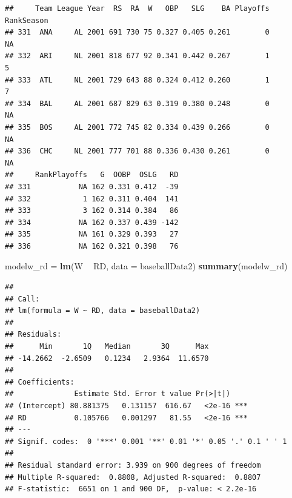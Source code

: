 \documentclass[
]{article}
\newenvironment{Shaded}{\begin{snugshade}}{\end{snugshade}}
\newcommand{\DataTypeTok}[1]{\textcolor[rgb]{0.13,0.29,0.53}{#1}}
\newcommand{\DecValTok}[1]{\textcolor[rgb]{0.00,0.00,0.81}{#1}}
\newcommand{\KeywordTok}[1]{\textcolor[rgb]{0.13,0.29,0.53}{\textbf{#1}}}
\newcommand{\NormalTok}[1]{#1}
\newcommand{\OperatorTok}[1]{\textcolor[rgb]{0.81,0.36,0.00}{\textbf{#1}}}
\newcommand{\StringTok}[1]{\textcolor[rgb]{0.31,0.60,0.02}{#1}}
\begin{document}
\begin{Shaded}
\end{Shaded}

\begin{verbatim}
##     Team League Year  RS  RA  W   OBP   SLG    BA Playoffs RankSeason
## 331  ANA     AL 2001 691 730 75 0.327 0.405 0.261        0         NA
## 332  ARI     NL 2001 818 677 92 0.341 0.442 0.267        1          5
## 333  ATL     NL 2001 729 643 88 0.324 0.412 0.260        1          7
## 334  BAL     AL 2001 687 829 63 0.319 0.380 0.248        0         NA
## 335  BOS     AL 2001 772 745 82 0.334 0.439 0.266        0         NA
## 336  CHC     NL 2001 777 701 88 0.336 0.430 0.261        0         NA
##     RankPlayoffs   G  OOBP  OSLG   RD
## 331           NA 162 0.331 0.412  -39
## 332            1 162 0.311 0.404  141
## 333            3 162 0.314 0.384   86
## 334           NA 162 0.337 0.439 -142
## 335           NA 161 0.329 0.393   27
## 336           NA 162 0.321 0.398   76
\end{verbatim}

\begin{Shaded}
\begin{Highlighting}[]
\NormalTok{modelw_rd =}\StringTok{ }\KeywordTok{lm}\NormalTok{(W }\OperatorTok{~}\StringTok{ }\NormalTok{RD, }\DataTypeTok{data =}\NormalTok{ baseballData2)}
\KeywordTok{summary}\NormalTok{(modelw_rd)}
\end{Highlighting}
\end{Shaded}

\begin{verbatim}
## 
## Call:
## lm(formula = W ~ RD, data = baseballData2)
## 
## Residuals:
##      Min       1Q   Median       3Q      Max 
## -14.2662  -2.6509   0.1234   2.9364  11.6570 
## 
## Coefficients:
##              Estimate Std. Error t value Pr(>|t|)    
## (Intercept) 80.881375   0.131157  616.67   <2e-16 ***
## RD           0.105766   0.001297   81.55   <2e-16 ***
## ---
## Signif. codes:  0 '***' 0.001 '**' 0.01 '*' 0.05 '.' 0.1 ' ' 1
## 
## Residual standard error: 3.939 on 900 degrees of freedom
## Multiple R-squared:  0.8808, Adjusted R-squared:  0.8807 
## F-statistic:  6651 on 1 and 900 DF,  p-value: < 2.2e-16
\end{verbatim}
\end{document}
